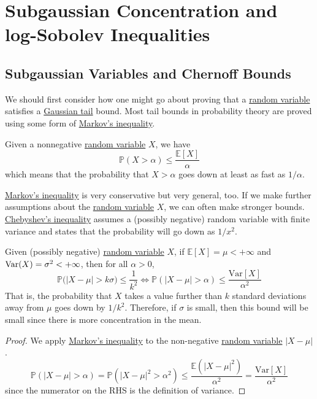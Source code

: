 \section{Subgaussian Concentration and log-Sobolev Inequalities}

\subsection{Subgaussian Variables and Chernoff Bounds}
  
  We should first consider how one might go about proving that a \hyperref[prob-def:random-variable]{random variable} satisfies a \hyperref[prob-thm:gaussian-tail-inequality]{Gaussian tail} bound. Most tail bounds in probability theory are proved using some form of \hyperref[thm:markovs-inequality]{Markov's inequality}. 
  \begin{lemma}
    \label{thm:markovs-inequality-2}
  Given a nonnegative \hyperref[prob-def:random-variable]{random variable} $X$, we have 
  \begin{equation}
    \mathbb{P}(X > \alpha) \leq \frac{\mathbb{E}[X]}{\alpha}
  \end{equation}
  which means that the probability that $X > \alpha$ goes down at least as fast as $1/\alpha$. 
  \end{lemma}

  \hyperref[thm:markovs-inequality-2]{Markov's inequality} is very conservative but very general, too. If we make further assumptions about the \hyperref[prob-def:random-variable]{random variable} $X$, we can often make stronger bounds. \hyperref[thm:chebyshevs-inequality]{Chebyshev's inequality} assumes a (possibly negative) random variable with finite variance and states that the probability will go down as $1/x^2$. 

  \begin{theorem}
    \label{thm:chebyshev-inequality}
  Given (possibly negative) \hyperref[prob-def:random-variable]{random variable} $X$, if $\mathbb{E}[X] = \mu < +\infty$ and $\operatorname{Var}(X) = \sigma^2 < +\infty$, then for all $\alpha > 0$, 
  \begin{equation}
    \mathbb{P} \big( |X - \mu| > k \sigma \big) \leq \frac{1}{k^2} \iff \mathbb{P}(|X - \mu| > \alpha) \leq \frac{\mathrm{Var}[X]}{\alpha^2}
  \end{equation}
  That is, the probability that $X$ takes a value further than $k$ standard deviations away from $\mu$ goes down by $1/k^2$. Therefore, if $\sigma$ is small, then this bound will be small since there is more concentration in the mean. 
  \end{theorem}
  \begin{proof}
  We apply \hyperref[thm:markovs-inequality-2]{Markov's inequality} to the non-negative \hyperref[prob-def:random-variable]{random variable} $|X - \mu|$. 
  \begin{equation}
    \mathbb{P}(|X - \mu| > \alpha) = \mathbb{P}(|X - \mu|^2 > \alpha^2) \leq \frac{\mathbb{E}(|X - \mu|^2)}{\alpha^2} = \frac{\mathrm{Var}[X]}{\alpha^2}
  \end{equation}
  since the numerator on the RHS is the definition of variance. 
  \end{proof}

